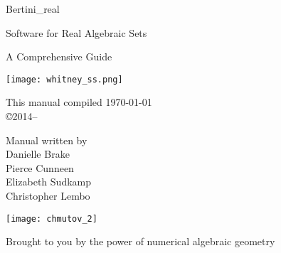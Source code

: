 \documentclass[10pt, twoside]{article}
\begin{document}
\pagestyle{front}



\begin{titlepage}

	\begin{center}
	\vspace{2cm}
	{\Large Bertini\_real}

\vspace{\baselineskip}
	{\large Software for Real Algebraic Sets}



	{\large A Comprehensive Guide}

	\vspace{3cm}
	\texttt{[image: whitney\_ss.png]}
	\end{center}

	\vfill

	\begin{minipage}{\linewidth}

	\begin{minipage}{0.4\linewidth}
	\centering
	This manual compiled \today \\
	\copyright 2014--\the\year
	\end{minipage}
	\hfill
	\begin{minipage}{0.4\linewidth}
	\centering Manual written by \vspace{\baselineskip}
	\\  Danielle Brake \\ Pierce Cunneen \\ Elizabeth Sudkamp \\ Christopher Lembo
	\end{minipage}

	\end{minipage}



\end{titlepage}



\clearpage

\thispagestyle{empty}

\quad
\vspace{2in}

\begin{center}
\texttt{[image: chmutov\_2]}

Brought to you by the power of numerical algebraic geometry
\end{center}


\vfill
\end{document}
